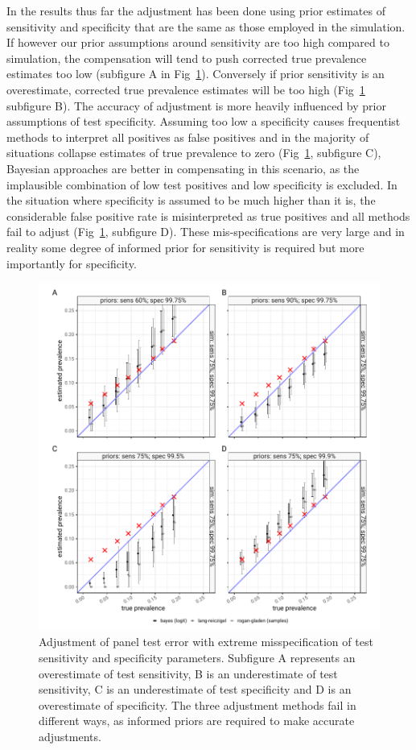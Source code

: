 \documentclass[a4paper, 12pt, twoside]{article}
\begin{document}
In the results thus far the adjustment has been done using prior estimates of sensitivity and specificity that are the same as those employed in the simulation. If however our prior assumptions around sensitivity are too high compared to simulation, the compensation will tend to push corrected true prevalence estimates too low (subfigure A in Fig~\ref{fig:B5}). Conversely if prior sensitivity is an overestimate, corrected true prevalence estimates will be too high (Fig~\ref{fig:B5} subfigure B). The accuracy of adjustment is more heavily influenced by prior assumptions of test specificity. Assuming too low a specificity causes frequentist methods to interpret all positives as false positives and in the majority of situations collapse estimates of true prevalence to zero (Fig~\ref{fig:B5}, subfigure C), Bayesian approaches are better in compensating in this scenario, as the implausible combination of low test positives and low specificity is excluded. In the situation where specificity is assumed to be much higher than it is, the considerable false positive rate is misinterpreted as true positives and all methods fail to adjust (Fig~\ref{fig:B5}, subfigure D). These mis-specifications are very large and in reality some degree of informed prior for sensitivity is required but more importantly for specificity.

\begin{figure}[h!]
\centering
  \includegraphics{fig/bayesian_sim_mismatch_v2}
  \caption{Adjustment of panel test error with extreme misspecification of test sensitivity and specificity parameters. Subfigure A represents an overestimate of test sensitivity, B is an underestimate of test sensitivity, C is an underestimate of test specificity and D is an overestimate of specificity. The three adjustment methods fail in different ways, as informed priors are required to make accurate adjustments.}
\label{fig:B5}
\end{figure}
\end{document}
